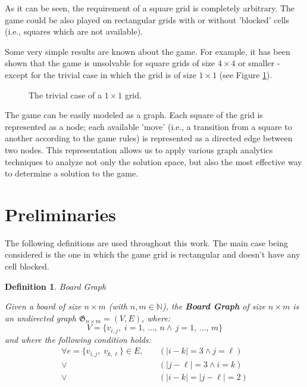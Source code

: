 \documentclass[conference]{IEEEtran}
\newtheorem{definition}{Definition}[section]
\begin{document}
As it can be seen, the requirement of a square grid is completely arbitrary. The game could be also played on rectangular grids with or without 'blocked' cells (i.e., squares which are not available).

Some very simple results are known about the game. 
For example, it has been shown that the game is unsolvable for square grids of size $4 \times 4$ or smaller - except for the trivial case in which the grid is of size $1 \times 1$ (see Figure \ref{fig:trivial_case}).

\begin{figure}[ht]
\centering
{}
\caption{The trivial case of a $1 \times 1$ grid.}
\label{fig:trivial_case}
\end{figure}

The game can be easily modeled as a graph. Each square of the grid is represented as a node; each available 'move' (i.e., a transition from a square to another according to the game rules) is represented as a directed edge between two nodes.
This representation allows us to apply various graph analytics techniques to analyze not only the solution space, but also the most effective way to determine a solution to the game.

\section{Preliminaries}
The following definitions are used throughout this work. The main case being considered is the one in which the game grid is rectangular and doesn't have any cell blocked.

\begin{definition}{Board Graph}{}
\label{def:board_graph}

Given a board of size $n \times m$ (with $n, m \in \mathbb{N}$), the \textbf{Board Graph} of size $n \times m$ is an undirected graph $\mathfrak{G}_{n \times m} = (V, E)$, where:
$$
    V = \{v_{i,j},\;i = 1,\,\dots,\,n \land \, j = 1,\,\dots,\,m\}
$$
and where the following condition holds:
\begin{align*}
\forall e = \{v_{i,j},\;v_{k,\ell}\} \in E,\quad&(|i - k| = 3 \land j = \ell) \\
\lor\,& (|j - \ell| = 3 \land i = k) \\
\lor\,& (|i - k| = |j - \ell| = 2)
\end{align*}

\end{definition}
\end{document}
